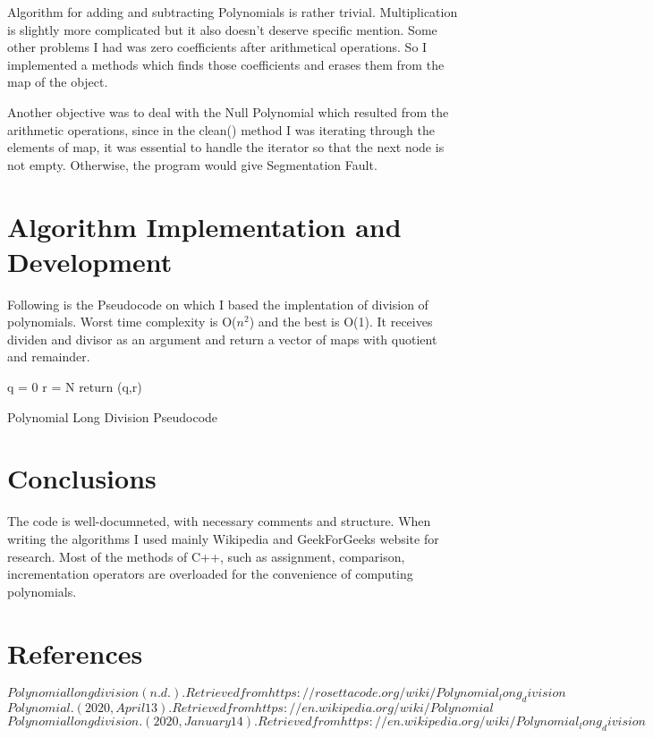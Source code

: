 \documentclass{article}
\begin{document}
Algorithm for adding and subtracting Polynomials is rather trivial. Multiplication is 
slightly more complicated but it also doesn't deserve specific mention. Some other
problems I had was zero coefficients after arithmetical operations. So I implemented
a methods which finds those coefficients and erases them from the map of the object. 

Another objective was to deal with the Null Polynomial which resulted from the arithmetic
operations, since in the clean() method I was iterating through the elements of map,
it was essential to handle the iterator so that the next node is not empty. Otherwise,
the program would give Segmentation Fault.
\newpage
\section{Algorithm Implementation and Development}
Following is the Pseudocode on which I based the implentation of division of polynomials.
Worst time complexity is O($n^2$) and the best is O(1). It receives dividen and divisor
as an argument and return a vector of maps with quotient and remainder.


\begin{algorithm}[H]
    \SetAlgoLined

     q = 0\;
     r = N\;
     return (q,r)\;
     \caption{Polynomial Long Division Pseudocode}
    \end{algorithm}
\section{Conclusions}
The code is well-documneted, with necessary comments and structure. When
writing the algorithms I used mainly Wikipedia and GeekForGeeks website
for research. Most of the methods of C++, such as assignment, comparison, incrementation
operators are overloaded for the convenience of computing polynomials.

\section{References}
\begin{thebibliography}{2}
    $Polynomial long division (n.d.). Retrieved from https://rosettacode.org/wiki/Polynomial_long_division$
    $Polynomial. (2020, April 13). Retrieved from https://en.wikipedia.org/wiki/Polynomial
    $
    $Polynomial long division. (2020, January 14). Retrieved from https://en.wikipedia.org/wiki/Polynomial_long_division$
\end{thebibliography}

\begin{appendices}
\end{appendices}
\end{document}
